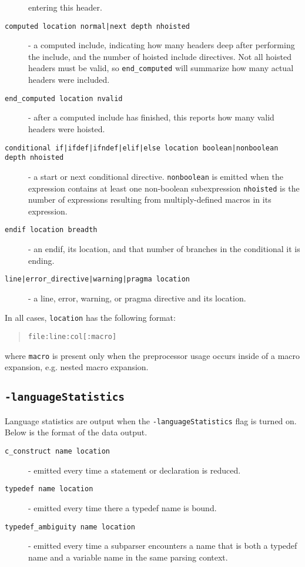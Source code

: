 \documentclass{report}
\begin{document}
\begin{description}
  entering this header.
\item[\texttt{computed location normal|next depth nhoisted}] - a computed
  include, indicating how many headers deep after performing the
  include, and the number of hoisted include directives.  Not all
  hoisted headers must be valid, so \verb"end_computed" will summarize how
  many actual headers were included.
\item[\texttt{end\_computed location nvalid}] - after a computed include has
  finished, this reports how many valid headers were hoisted.
\item[\texttt{conditional if|ifdef|ifndef|elif|else location
  boolean|nonboolean depth nhoisted}] - a start or next conditional
  directive. \verb"nonboolean" is emitted when the expression contains at
  least one non-boolean subexpression \verb"nhoisted" is the number of
  expressions resulting from multiply-defined macros in its
  expression.
\item[\texttt{endif location breadth}] - an endif, its location, and that
  number of branches in the conditional it is ending.
\item[\texttt{line|error\_directive|warning|pragma location}] - a line, error, warning,
  or pragma directive and its location.
\end{description}

In all cases, \verb"location" has the following format:

\begin{quote}
\verb"file:line:col[:macro]"
\end{quote}

where \verb"macro" is present only when the preprocessor usage occurs
inside of a macro expansion, e.g. nested macro expansion.


\subsection*{\texttt{-languageStatistics}}

Language statistics are output when the \verb"-languageStatistics" flag is
turned on.  Below is the format of the data output.

\begin{description}
\item[\texttt{c\_construct name location}] - emitted every time a statement
  or declaration is reduced.
\item[\texttt{typedef name location}] - emitted every time there a typedef
  name is bound.
\item[\texttt{typedef\_ambiguity name location}] - emitted every time a
  subparser encounters a name that is both a typedef name and a
  variable name in the same parsing context.
\end{description}
\end{document}
